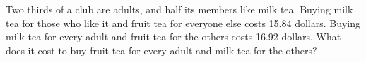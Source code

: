 Two thirds of a club are adults, and half its members like milk tea. Buying milk tea for those who like it and fruit tea for everyone else costs 15.84 dollars. Buying milk tea for every adult and fruit tea for the others costs 16.92 dollars. What does it cost to buy fruit tea for every adult and milk tea for the others?
